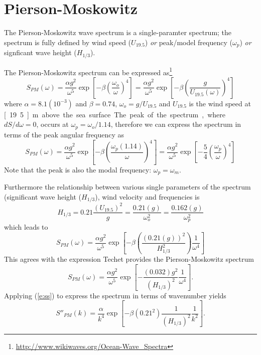 \documentclass[11pt]{article}
\begin{document}
\section{Pierson-Moskowitz}
The Pierson-Moskowitz wave spectrum is a single-paramter spectrum; the spectrum is fully defined by wind speed  ($U_{19.5}$) \emph{or} peak/model frequency ($\omega_p$) \emph{or} signficant wave height ($H_{1/3}$).  


The Pierson-Moskowitz spectrum can be expressed as\footnote{\url{http://www.wikiwaves.org/Ocean-Wave_Spectra}}
\begin{equation}
S_{PM}(\omega)=\frac{\alpha g^2}{\omega^5} \exp{\left[ -\beta \left(\frac{\omega_o}{\omega}\right)^4 \right]} =\frac{\alpha g^2}{\omega^5} \exp{\left[ -\beta \left(\frac{g}{U_{19.5}(\omega)}\right)^4 \right]}
\end{equation}
where $\alpha=8.1(10^{-3})$ and $\beta=0.74$, $\omega_o = g/U_{19.5}$ and $U_{19.5}$ is the wind speed at \unit[19.5]{m} above the sea surface.

The peak of the spectrum, where $dS/d\omega=0$, occurs at $\omega_p=\omega_o/1.14$, therefore we can express the spectrum in terms of the peak angular frequency as
\begin{equation}
  S_{PM}(\omega)=\frac{\alpha g^2}{\omega^5} \exp{\left[ -\beta \left(\frac{\omega_p (1.14)}{\omega}\right)^4 \right]} =\frac{\alpha g^2}{\omega^5} \exp{\left[ -\frac{5}{4} \left(\frac{\omega_p}{\omega}\right)^4 \right]}
  \end{equation}
Note that the peak is also the modal frequency: $\omega_p=\omega_m$. 

Furthermore the relationship between various single parameters of the spectrum (significant wave height ($H_{1/3}$), wind velocity and frequencies is
\begin{equation}
H_{1/3} = 0.21 \frac{\left(U_{19.5}\right)^2}{g} = \frac{0.21(g)}{\omega_o^2} = \frac{0.162(g)}{\omega_p^2}
\label{e:pmh}
\end{equation}
which leads to 
\begin{equation}
S_{PM}(\omega)=\frac{\alpha g^2}{\omega^5} \exp{\left[ -\beta \left(\frac{(0.21(g))^2}{H_{1/3}^2}\right) \frac{1}{\omega^4} \right]}
\label{e:pmh3}
\end{equation}
This agrees with the expression Techet provides the Pierson-Moskowitz spectrum 
\begin{equation}
S_{PM}(\omega)=\frac{\alpha g^2}{\omega^5} \exp{\left[ - \frac{(0.032)g^2}{\left(H_{1/3}\right)^2} \frac{1}{\omega^4} \right]}.
\label{e:pmh4}
\end{equation} 
Applying (\ref{e:ss}) to express the spectrum in terms of wavenumber yields
\begin{equation}
S''_{PM}(k) = \frac{\alpha}{k^4} \exp{\left[ -\beta (0.21^2) \frac{1}{(H_{1/3})^2}\frac{1}{k^2} \right]}.
\label{e:pmk}
\end{equation}
\end{document}
